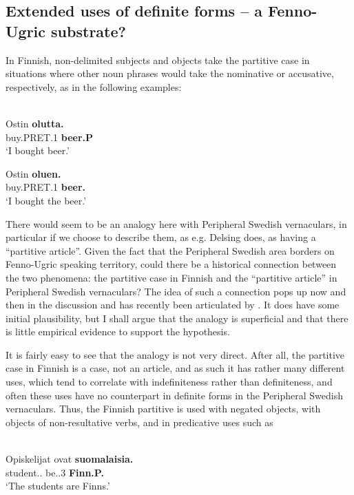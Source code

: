 \subsection{ Extended uses of definite forms – a Fenno-Ugric substrate?}

In Finnish, non-delimited subjects and objects take the partitive case in situations where other noun phrases would take the nominative or accusative, respectively, as in the following examples:

\ea\label{}
\\
\gll Ostin  \textbf{olutta.}\\
buy.PRET.1{\sg}  \textbf{beer.P{\art}}\\
\glt ‘I bought beer.’

\z

\ea
\gll Ostin  \textbf{oluen.}\\
buy.PRET.1{\sg}  \textbf{beer.{\acc}}\\
\glt  ‘I bought the beer.’

\z

There would seem to be an analogy here with Peripheral Swedish vernaculars, in particular if we choose to describe them, as e.g. Delsing does, as having a “partitive article”. Given the fact that the Peripheral Swedish area borders on Fenno-Ugric speaking territory, could there be a historical connection between the two phenomena: the partitive case in Finnish and the “partitive article” in Peripheral Swedish vernaculars? The idea of such a connection pops up now and then in the discussion and has recently been articulated by \citet{Riesler2002}. It does have some initial plausibility, but I shall argue that the analogy is superficial and that there is little empirical evidence to support the hypothesis.

It is fairly easy to see that the analogy is not very direct. After all, the partitive case in Finnish is a case, not an article, and as such it has rather many different uses, which tend to correlate with indefiniteness rather than definiteness, and often these uses have no counterpart in definite forms in the Peripheral Swedish vernaculars. Thus, the Finnish partitive is used with negated objects, with objects of non-resultative verbs, and in predicative uses such as 

\ea \label{} 
\\
\gll Opiskelijat  ovat  \textbf{suomalaisia.}\\
student.{\nom}.{\pl}  be.{\prs}.3{\pl}  \textbf{Finn.P{\art}.{\pl}}\\
\glt ‘The students are Finns.’

